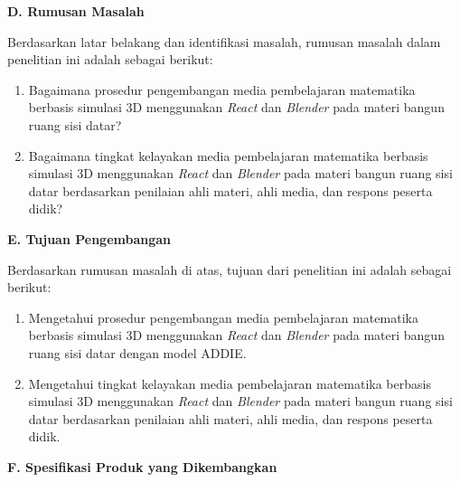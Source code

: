 \textbf{D. Rumusan Masalah}

\hspace*{1cm}Berdasarkan latar belakang dan identifikasi masalah, rumusan masalah dalam penelitian ini adalah sebagai berikut:
\begin{enumerate}
    \item Bagaimana prosedur pengembangan media pembelajaran matematika berbasis simulasi 3D menggunakan \textit{React} dan \textit{Blender} pada materi bangun ruang sisi datar?
    \item Bagaimana tingkat kelayakan media pembelajaran matematika berbasis simulasi 3D menggunakan \textit{React} dan \textit{Blender} pada materi bangun ruang sisi datar berdasarkan penilaian ahli materi, ahli media, dan respons peserta didik?
\end{enumerate}

\textbf{E. Tujuan Pengembangan}

\hspace*{1cm}Berdasarkan rumusan masalah di atas, tujuan dari penelitian ini adalah sebagai berikut:
\begin{enumerate}
    \item Mengetahui prosedur pengembangan media pembelajaran matematika berbasis simulasi 3D menggunakan \textit{React} dan \textit{Blender} pada materi bangun ruang sisi datar dengan model ADDIE.
    \item Mengetahui tingkat kelayakan media pembelajaran matematika berbasis simulasi 3D menggunakan \textit{React} dan \textit{Blender} pada materi bangun ruang sisi datar berdasarkan penilaian ahli materi, ahli media, dan respons peserta didik.
\end{enumerate}

\textbf{F. Spesifikasi Produk yang Dikembangkan}

